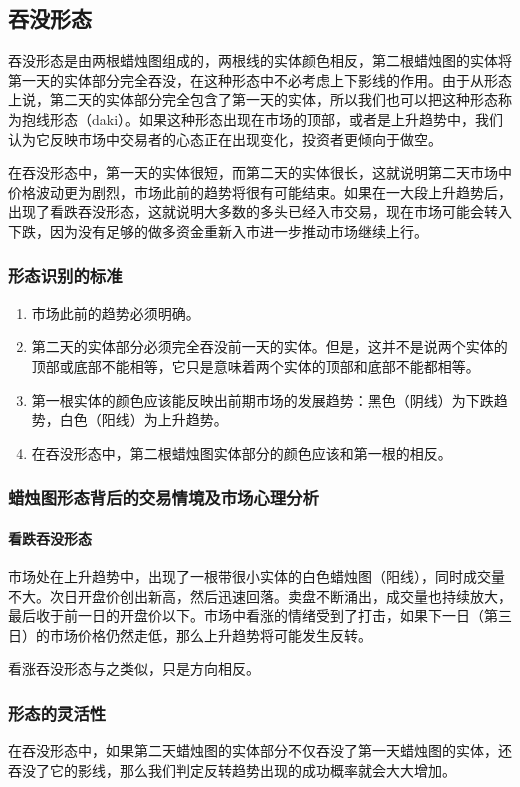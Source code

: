 \subsection{吞没形态}
吞没形态是由两根蜡烛图组成的，两根线的实体颜色相反，第二根蜡烛图的实体将第一天的实体部分完全吞没，在这种形态中不必考虑上下影线的作用。由于从形态上说，第二天的实体部分完全包含了第一天的实体，所以我们也可以把这种形态称为抱线形态（daki）。如果这种形态出现在市场的顶部，或者是上升趋势中，我们认为它反映市场中交易者的心态正在出现变化，投资者更倾向于做空。

在吞没形态中，第一天的实体很短，而第二天的实体很长，这就说明第二天市场中价格波动更为剧烈，市场此前的趋势将很有可能结束。如果在一大段上升趋势后，出现了看跌吞没形态，这就说明大多数的多头已经入市交易，现在市场可能会转入下跌，因为没有足够的做多资金重新入市进一步推动市场继续上行。
\subsubsection*{形态识别的标准}
\begin{enumerate}
    \item 市场此前的趋势必须明确。
    \item  第二天的实体部分必须完全吞没前一天的实体。但是，这并不是说两个实体的顶部或底部不能相等，它只是意味着两个实体的顶部和底部不能都相等。
    \item  第一根实体的颜色应该能反映出前期市场的发展趋势：黑色（阴线）为下跌趋势，白色（阳线）为上升趋势。
    \item  在吞没形态中，第二根蜡烛图实体部分的颜色应该和第一根的相反。
\end{enumerate}
\subsubsection*{蜡烛图形态背后的交易情境及市场心理分析}
\paragraph{看跌吞没形态} 市场处在上升趋势中，出现了一根带很小实体的白色蜡烛图（阳线），同时成交量不大。次日开盘价创出新高，然后迅速回落。卖盘不断涌出，成交量也持续放大，最后收于前一日的开盘价以下。市场中看涨的情绪受到了打击，如果下一日（第三日）的市场价格仍然走低，那么上升趋势将可能发生反转。

看涨吞没形态与之类似，只是方向相反。
\subsubsection*{形态的灵活性}
在吞没形态中，如果第二天蜡烛图的实体部分不仅吞没了第一天蜡烛图的实体，还吞没了它的影线，那么我们判定反转趋势出现的成功概率就会大大增加。

